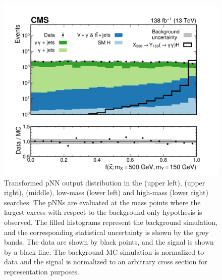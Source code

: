 \begin{figure}
    \includegraphics[width=.49\textwidth]{Figures/Dihiggs/categorisation/intermediate_transformed_score_NMSSM_XYH_Y_gg_H_tautau_MX_500_MY_150_NMSSM_XYH_Y_gg_H_tautau_MX_500_MY_150_paper.pdf}
    \caption[Transformed pNN Output Scores in the \XZeroHH and \XYH Searches]{Transformed pNN output distribution in the \XZeroHH (upper left), \XTwoHH (upper right), \XYttHgg (middle), low-mass \XYggHtt (lower left) and high-mass \XYggHtt (lower right) searches. The pNNs are evaluated at the mass points where the largest excess with respect to the background-only hypothesis is observed. The filled histograms represent the background simulation, and the corresponding statistical uncertainty is shown by the grey bands. The data are shown by black points, and the signal is shown by a black line. The background MC simulation is normalized to data and the signal is normalized to an arbitrary cross section for representation purposes.}\label{fig:pnn_resonant}
\end{figure}

